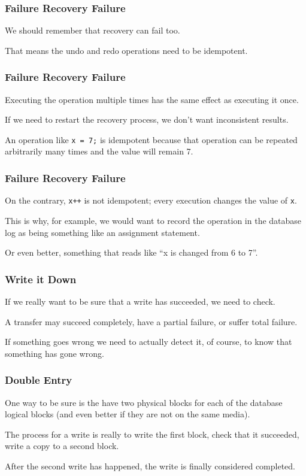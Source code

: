 \begin{frame}
\frametitle{Failure Recovery Failure}

We should remember that recovery can fail too. 

That means the undo and redo operations need to be \alert{idempotent}.

\end{frame}


\begin{frame}
\frametitle{Failure Recovery Failure}

Executing the operation multiple times has the same effect as executing it once. 

If we need to restart the recovery process, we don't want inconsistent results. 

An operation like \texttt{x = 7;} is idempotent because that operation can be repeated arbitrarily many times and the value will remain 7.


\end{frame}

\begin{frame}
\frametitle{Failure Recovery Failure}

On the contrary, \texttt{x++} is not idempotent; every execution changes the value of \texttt{x}.

 This is why, for example, we would want to record the operation in the database log as being something like an assignment statement. 
 
 Or even better, something that reads like ``x is changed from 6 to 7''.

\end{frame}

\begin{frame}
\frametitle{Write it Down}

If we really want to be sure that a write has succeeded, we need to check. 

A transfer may succeed completely, have a partial failure, or suffer total failure. 

If something goes wrong we need to actually detect it, of course, to know that something has gone wrong. 

\end{frame}


\begin{frame}
\frametitle{Double Entry}

One way to be sure is the have two physical blocks for each of the database logical blocks (and even better if they are not on the same media). 

The process for a write is really to write the first block, check that it succeeded, write a copy to a second block. 

After the second write has happened, the write is finally considered completed. 


\end{frame}


